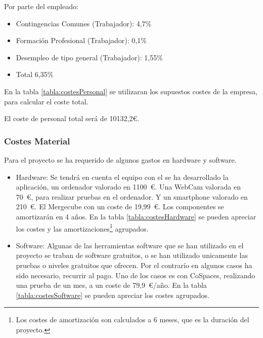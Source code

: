 Por parte del empleado:
\begin{itemize}
	\item Contingencias Comunes (Trabajador): 4,7\%	
	\item Formación Profesional (Trabajador): 0,1\%
	\item Desempleo de tipo general (Trabajador): 1,55\%
	\item Total 6,35\%
\end{itemize}

En la tabla \ref{tabla:costesPersonal} se utilizaran los supuestos costes de la empresa, para calcular el coste total.

El coste de personal total será de 10132,2\euro.


\subsubsection{Costes Material}
Para el proyecto se ha requerido de algunos gastos en hardware y software.

\begin{itemize}
	\item Hardware:
	Se tendrá en cuenta el equipo con el se ha desarrollado la aplicación, un ordenador valorado en 1100~\euro. Una WebCam valorada en 70~\euro, para realizar pruebas en el ordenador. Y un smartphone valorado en 210~\euro. El Mergecube con un coste de 19,99~\euro. Los componentes se amortizarán en 4 años. En la tabla \ref{tabla:costesHardware} se pueden apreciar los costes  y las amortizaciones\footnote{Los costes de amortización son calculados a 6 meses, que es la duración del proyecto.} agrupados.
	\item Software: Algunas de las herramientas software que se han utilizado en el proyecto se traban de software gratuitos, o se han utilizado unicamente las pruebas o niveles gratuitos que ofrecen. Por el contrarío en algunos casos ha sido necesario, recurrir al pago. Uno de los casos es con CoSpaces, realizando una prueba de un mes, a un coste de 79,9~\euro/año. En la tabla \ref{tabla:costesSoftware} se pueden apreciar los costes agrupados.
\end{itemize}



